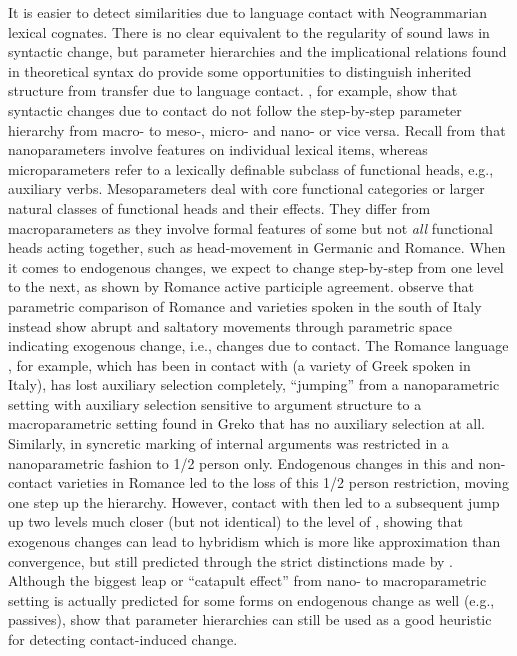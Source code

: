 \documentclass[output=paper,colorlinks,citecolor=brown]{langscibook}
\begin{document}
\noindent It is easier to detect similarities due to language contact with Neogrammarian lexical cognates. There is no clear equivalent to the regularity of sound laws in syntactic change, but parameter hierarchies and the implicational relations found in theoretical syntax do provide some opportunities to distinguish inherited structure from transfer due to language contact. \citet{mm:ledgewayforth}, for example, show that syntactic changes due to contact do not follow the step-by-step parameter hierarchy from macro- to meso-, micro- and nano- or vice versa. Recall from  that nanoparameters involve features on individual lexical items, whereas microparameters refer to a lexically definable subclass of functional heads, e.g., auxiliary verbs. Mesoparameters deal with core functional categories or larger natural classes of functional heads and their effects. They differ from macroparameters as they involve formal features of some but not \textit{all} functional heads acting together, such as head-movement in Germanic and Romance. When it comes to endogenous changes, we expect  to change step-by-step from one level to the next, as shown by Romance active participle agreement. \citet{mm:ledgewayforth} observe that parametric comparison of Romance and  varieties spoken in the south of Italy instead show abrupt and saltatory movements through parametric space indicating exogenous change, i.e., changes due to contact. The Romance language , for example, which has been in contact with  (a variety of Greek spoken in Italy), has lost auxiliary selection completely, ``jumping'' from a nanoparametric setting with auxiliary selection sensitive to argument structure to a macroparametric setting found in Greko that has no auxiliary selection at all. Similarly, in  syncretic marking of internal arguments was restricted in a nanoparametric fashion to 1/2 person only. Endogenous changes in this and non-contact varieties in Romance led to the loss of this 1/2 person restriction, moving one step up the hierarchy. However, contact with  then led to a subsequent jump up two levels much closer (but not identical) to the level of , showing that exogenous changes can lead to hybridism which is more like approximation than convergence, but still predicted through the strict distinctions made by . Although the biggest leap or ``catapult effect'' from nano- to macroparametric setting is actually predicted for some forms on endogenous change as well (e.g., passives), \citet{mm:ledgewayforth}  show that parameter hierarchies can still be used as a good heuristic for detecting contact-induced change.
\end{document}
